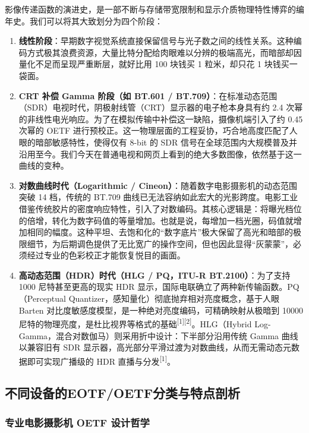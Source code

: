\documentclass[12pt, a4paper]{ctexart}
\newcommand{\scite}[1]{\textsuperscript{[#1]}}
\begin{document}
影像传递函数的演进史，是一部不断与存储带宽限制和显示介质物理特性博弈的编年史。我们可以将其大致划分为四个阶段：

\begin{enumerate}[label=\textbf{阶段 \arabic*：}]
    \item \textbf{线性阶段}：早期数字视觉系统直接保留信号与光子数之间的线性关系。这种编码方式极其浪费资源，大量比特分配给肉眼难以分辨的极端高光，而暗部却因量化不足而呈现严重断层，就好比用 100 块钱买 1 粒米，却只花 1 块钱买一袋面。
    \item \textbf{CRT 补偿 Gamma 阶段（如 BT.601 / BT.709）}：在标准动态范围（SDR）电视时代，阴极射线管（CRT）显示器的电子枪本身具有约 2.4 次幂的非线性电光响应。为了在模拟传输中补偿这一缺陷，摄像机端引入了约 0.45 次幂的 OETF 进行预校正。这一物理层面的工程妥协，巧合地高度匹配了人眼的暗部敏感特性，使得仅有 8-bit 的 SDR 信号在全球范围内大规模普及并沿用至今。我们今天在普通电视和网页上看到的绝大多数图像，依然基于这一曲线的变种。
    \item \textbf{对数曲线时代（Logarithmic / Cineon）}：随着数字电影摄影机的动态范围突破 14 档，传统的 BT.709 曲线已无法容纳如此宏大的光影跨度。电影工业借鉴传统胶片的密度响应特性，引入了对数编码。其核心逻辑是：将曝光档位的倍增，转化为数字码值的等量增加。也就是说，每增加一档光圈，码值就增加相同的幅度。这种平坦、去饱和化的“数字底片”极大保留了高光和暗部的极限细节，为后期调色提供了无比宽广的操作空间，但也因此显得“灰蒙蒙”，必须经过专业的色彩校正才能恢复悦目的画面。
    \item \textbf{高动态范围（HDR）时代（HLG / PQ，ITU-R BT.2100）}：为了支持 1000 尼特甚至更高的现实 HDR 显示，国际电联确立了两种新传输函数。PQ（Perceptual Quantizer，感知量化）彻底抛弃相对亮度概念，基于人眼 Barten 对比度敏感度模型，是一种绝对亮度编码，可精确映射从极暗到 10000 尼特的物理亮度，是杜比视界等格式的基础\scite{1}\scite{2}。HLG（Hybrid Log-Gamma，混合对数伽马）则采用折中设计：下半部分沿用传统 Gamma 曲线以兼容旧有 SDR 显示器，高光部分平滑过渡为对数曲线，从而无需动态元数据即可实现广播级的 HDR 直播与分发\scite{1}。
\end{enumerate}

\subsection{不同设备的EOTF/OETF分类与特点剖析}

\subsubsection{专业电影摄影机 OETF 设计哲学}
\end{document}
